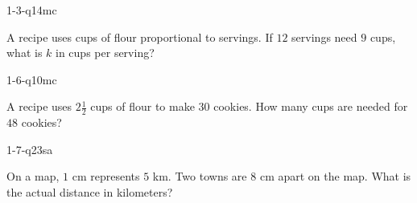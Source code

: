 \documentclass[12pt, fleqn, openany]{studyGuide}
\begin{document}
\renewcommand{\VMBookTitle}{7 Oklahoma OSTP Grade 7 Math Practice Tests}
\renewcommand{\VMBookSubtitle}{Comprehensive Test Prep with Detailed Answers}
\renewcommand{\VMFooterURL}{https://viewmath.com/grade7}
\renewcommand{\VMFooterURLDisplay}{ViewMath.com/Grade7}






\tableofcontents
\cleardoublepage
{}


\begin{practiceQuestion}{1-3-q14}{mc}
\begin{questionText}
A recipe uses cups of flour proportional to servings. If $12$ servings need $9$ cups, what is $k$ in cups per serving?
\end{questionText}
\end{practiceQuestion}

\begin{practiceQuestion}{1-6-q10}{mc}
\begin{questionText}
A recipe uses $2\frac{1}{2}$ cups of flour to make $30$ cookies. How many cups are needed for $48$ cookies?
\end{questionText}
\end{practiceQuestion}

\begin{practiceQuestion}{1-7-q23}{sa}
\begin{questionText}
On a map, $1$ cm represents $5$ km. Two towns are $8$ cm apart on the map. What is the actual distance in kilometers?
\end{questionText}
\end{practiceQuestion}
\end{document}
